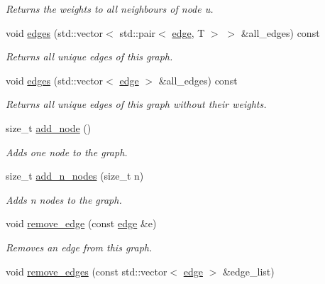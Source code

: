 \begin{DoxyCompactItemize}
\begin{DoxyCompactList}\small\item\em Returns the weights to all neighbours of node {\itshape u}. \end{DoxyCompactList}\item 
void \hyperlink{classlgraph_1_1wxgraph_a1b89f56544185e33d54e72a8ed19a789}{edges} (std\+::vector$<$ std\+::pair$<$ \hyperlink{namespacelgraph_a76bd7d50719f03de7a85db259d80d572}{edge}, T $>$ $>$ \&all\+\_\+edges) const
\begin{DoxyCompactList}\small\item\em Returns all unique edges of this graph. \end{DoxyCompactList}\item 
void \hyperlink{classlgraph_1_1wxgraph_ae99b335ca0cc70f619ae7c186d2dc7ac}{edges} (std\+::vector$<$ \hyperlink{namespacelgraph_a76bd7d50719f03de7a85db259d80d572}{edge} $>$ \&all\+\_\+edges) const
\begin{DoxyCompactList}\small\item\em Returns all unique edges of this graph without their weights. \end{DoxyCompactList}\item 
size\+\_\+t \hyperlink{classlgraph_1_1xxgraph_a6cb21d5e52afbb438a3e6643998c40cf}{add\+\_\+node} ()
\begin{DoxyCompactList}\small\item\em Adds one node to the graph. \end{DoxyCompactList}\item 
size\+\_\+t \hyperlink{classlgraph_1_1xxgraph_a8dd24aa48d55dfceaa87e47c32ae914a}{add\+\_\+n\+\_\+nodes} (size\+\_\+t n)
\begin{DoxyCompactList}\small\item\em Adds {\itshape n} nodes to the graph. \end{DoxyCompactList}\item 
void \hyperlink{classlgraph_1_1xxgraph_a46a75fa2a10a8674ab930e9dc766e2f9}{remove\+\_\+edge} (const \hyperlink{namespacelgraph_a76bd7d50719f03de7a85db259d80d572}{edge} \&e)
\begin{DoxyCompactList}\small\item\em Removes an edge from this graph. \end{DoxyCompactList}\item 
void \hyperlink{classlgraph_1_1xxgraph_aef7c4bf62f3f4db362b2d3accb3b6d3d}{remove\+\_\+edges} (const std\+::vector$<$ \hyperlink{namespacelgraph_a76bd7d50719f03de7a85db259d80d572}{edge} $>$ \&edge\+\_\+list)

\end{DoxyCompactItemize}
